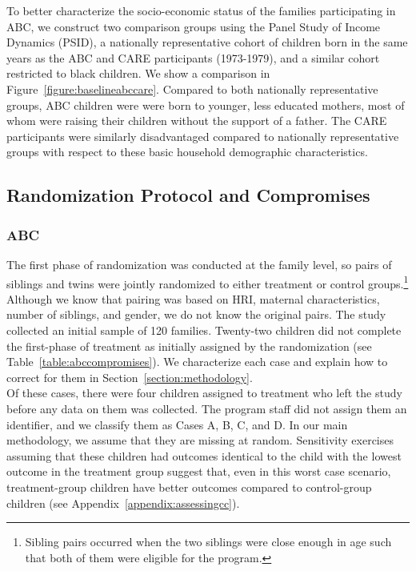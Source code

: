 \noindent To better characterize the socio-economic status of the families participating in ABC, we construct two comparison groups using the Panel Study of Income Dynamics (PSID), a nationally representative cohort of children born in the same years as the ABC and CARE participants (1973-1979), and a similar cohort restricted to black children. We show a comparison in Figure~\ref{figure:baselineabccare}. Compared to both nationally representative groups, ABC children were were born to younger, less educated mothers, most of whom were raising their children without the support of a father. The CARE participants were similarly disadvantaged compared to nationally representative groups with respect to these basic household demographic characteristics.\\

\subsection{Randomization Protocol and Compromises} \label{section:randomization}

\subsubsection{ABC}

\noindent The first phase of randomization was conducted at the family level, so pairs of siblings and twins were jointly randomized to either treatment or control groups.\footnote{Sibling pairs occurred when the two siblings were close enough in age such that both of them were eligible for the program.} Although we know that pairing was based on HRI, maternal characteristics, number of siblings, and gender, we do not know the original pairs. The study collected an initial sample of 120 families. Twenty-two children did not complete the first-phase of treatment as initially assigned by the randomization (see Table~\ref{table:abccompromises}). We characterize each case and explain how to correct for them in Section~\ref{section:methodology}.\\

\noindent Of these cases, there were four children assigned to treatment who left the study before any data on them was collected. The program staff did not assign them an identifier, and we classify them as Cases A, B, C, and D. In our main methodology, we assume that they are missing at random. Sensitivity exercises assuming that these children had outcomes identical to the child with the lowest outcome in the treatment group suggest that, even in this worst case scenario, treatment-group children have better outcomes compared to control-group children (see Appendix~\ref{appendix:assessingcc}).\\

